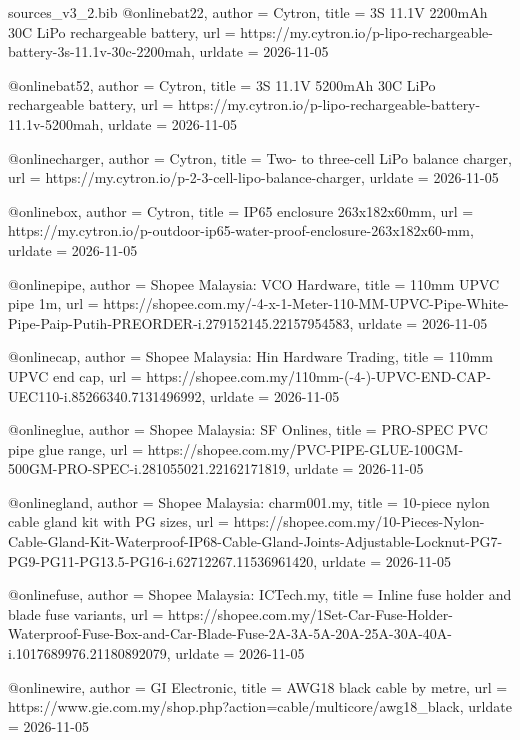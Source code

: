 \begin{filecontents*}[overwrite]{sources_v3_2.bib}
@online{bat22,
  author = {Cytron},
  title = {3S 11.1V 2200mAh 30C LiPo rechargeable battery},
  url = {https://my.cytron.io/p-lipo-rechargeable-battery-3s-11.1v-30c-2200mah},
  urldate = {2026-11-05}
}

@online{bat52,
  author = {Cytron},
  title = {3S 11.1V 5200mAh 30C LiPo rechargeable battery},
  url = {https://my.cytron.io/p-lipo-rechargeable-battery-11.1v-5200mah},
  urldate = {2026-11-05}
}

@online{charger,
  author = {Cytron},
  title = {Two- to three-cell LiPo balance charger},
  url = {https://my.cytron.io/p-2-3-cell-lipo-balance-charger},
  urldate = {2026-11-05}
}

@online{box,
  author = {Cytron},
  title = {IP65 enclosure 263x182x60mm},
  url = {https://my.cytron.io/p-outdoor-ip65-water-proof-enclosure-263x182x60-mm},
  urldate = {2026-11-05}
}

@online{pipe,
  author = {Shopee Malaysia: VCO Hardware},
  title = {110mm UPVC pipe 1m},
  url = {https://shopee.com.my/-4-x-1-Meter-110-MM-UPVC-Pipe-White-Pipe-Paip-Putih-PREORDER-i.279152145.22157954583},
  urldate = {2026-11-05}
}

@online{cap,
  author = {Shopee Malaysia: Hin Hardware Trading},
  title = {110mm UPVC end cap},
  url = {https://shopee.com.my/110mm-(-4-)-UPVC-END-CAP-UEC110-i.85266340.7131496992},
  urldate = {2026-11-05}
}

@online{glue,
  author = {Shopee Malaysia: SF Onlines},
  title = {PRO-SPEC PVC pipe glue range},
  url = {https://shopee.com.my/PVC-PIPE-GLUE-100GM-500GM-PRO-SPEC-i.281055021.22162171819},
  urldate = {2026-11-05}
}

@online{gland,
  author = {Shopee Malaysia: charm001.my},
  title = {10-piece nylon cable gland kit with PG sizes},
  url = {https://shopee.com.my/10-Pieces-Nylon-Cable-Gland-Kit-Waterproof-IP68-Cable-Gland-Joints-Adjustable-Locknut-PG7-PG9-PG11-PG13.5-PG16-i.62712267.11536961420},
  urldate = {2026-11-05}
}

@online{fuse,
  author = {Shopee Malaysia: ICTech.my},
  title = {Inline fuse holder and blade fuse variants},
  url = {https://shopee.com.my/1Set-Car-Fuse-Holder-Waterproof-Fuse-Box-and-Car-Blade-Fuse-2A-3A-5A-20A-25A-30A-40A-i.1017689976.21180892079},
  urldate = {2026-11-05}
}

@online{wire,
  author = {GI Electronic},
  title = {AWG18 black cable by metre},
  url = {https://www.gie.com.my/shop.php?action=cable/multicore/awg18_black},
  urldate = {2026-11-05}
}


\end{filecontents*}
